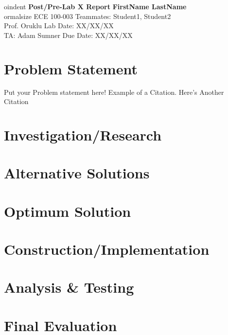 \documentclass[a4paper, 11pt]{article}
\begin{document}

oindent
\large\textbf{Post/Pre-Lab X Report} \hfill \textbf{FirstName LastName} \\

ormalsize ECE 100-003 \hfill Teammates: Student1, Student2 \\
Prof. Oruklu \hfill Lab Date: XX/XX/XX \\
TA: Adam Sumner \hfill Due Date: XX/XX/XX

\section*{Problem Statement}
Put your Problem statement here! Example of a Citation\cite[p.219]{Robotics}. Here's Another Citation\cite{Flueck}

\section*{Investigation/Research}
\lipsum[2]

\section*{Alternative Solutions}
\lipsum[3]

\section*{Optimum Solution}
\lipsum[4]

\section*{Construction/Implementation}
\lipsum[5]

\section*{Analysis \& Testing}
\lipsum[6]

\section*{Final Evaluation}
\lipsum[7]
\end{document}
